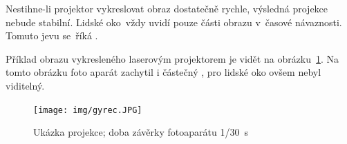 Nestihne-li projektor vykreslovat obraz dostatečně rychle, výsledná projekce nebude stabilní. Lidské oko~vždy uvidí pouze části obrazu v~časové návaznosti. Tomuto jevu se~říká .~\cite{laser-projection}

Příklad obrazu vykresleného laserovým projektorem je vidět na obrázku~\ref{fig:gyrec}. Na tomto obrázku foto aparát zachytil i částečný , pro lidské oko ovšem nebyl viditelný.

\begin{figure}[htb]
  \centering
  \texttt{[image: img/gyrec.JPG]}
  \caption{\label{fig:gyrec} Ukázka projekce; doba závěrky fotoaparátu 1/30~s}
\end{figure}